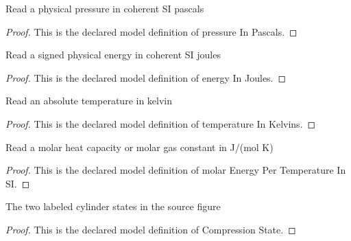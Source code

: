 \begin{definition}
  \label{def:physics:phyx-mini-0472:phyxminiproblems-problemphyxmini0472-pressureinpascals}
  Read a physical pressure in coherent SI pascals
\end{definition}
\begin{proof}
  This is the declared model definition of pressure In Pascals.
\end{proof}
\begin{definition}
  \label{def:physics:phyx-mini-0472:phyxminiproblems-problemphyxmini0472-energyinjoules}
  Read a signed physical energy in coherent SI joules
\end{definition}
\begin{proof}
  This is the declared model definition of energy In Joules.
\end{proof}
\begin{definition}
  \label{def:physics:phyx-mini-0472:phyxminiproblems-problemphyxmini0472-temperatureinkelvins}
  Read an absolute temperature in kelvin
\end{definition}
\begin{proof}
  This is the declared model definition of temperature In Kelvins.
\end{proof}
\begin{definition}
  \label{def:physics:phyx-mini-0472:phyxminiproblems-problemphyxmini0472-molarenergypertemperatureinsi}
  Read a molar heat capacity or molar gas constant in J/(mol K)
\end{definition}
\begin{proof}
  This is the declared model definition of molar Energy Per Temperature In SI.
\end{proof}
\begin{definition}
  \label{def:physics:phyx-mini-0472:phyxminiproblems-problemphyxmini0472-compressionstate}
  The two labeled cylinder states in the source figure
\end{definition}
\begin{proof}
  This is the declared model definition of Compression State.
\end{proof}
